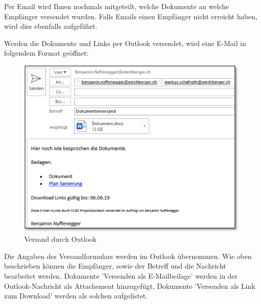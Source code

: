 Per Email wird Ihnen nochmals mitgeteilt, welche Dokumente an welche Empfänger versendet wurden. Falls Emails einen Empfänger nicht erreicht haben, wird dies ebenfalls aufgeführt.

\vspace{\baselineskip}

Werden die Dokumente und Links per Outlook versendet, wird eine E-Mail in folgendem Format geöffnet:
 
\begin{figure}   %
  \vspace{-30pt}      %
  \begin{center}
    \includegraphics[width=1\linewidth]{../chapters/11_Dokumentenablage/pictures/11-dkorb_Dok_Outlook.jpg}
  \end{center}
  \vspace{-20pt}
  \caption{Versand durch Outlook}
  \vspace{-10pt}
\end{figure}

Die Angaben des Versandformulars werden im Outlook übernommen. Wie oben beschrieben können die Empfänger, sowie der Betreff und die Nachricht bearbeitet werden. Dokumente 'Versenden als E-Mailbeilage' werden in der Outlook-Nachricht als Attachement hinzugefügt, Dokumente 'Versenden als Link zum Download' werden als solchen aufgelistet. 

\vspace{1.5cm}

